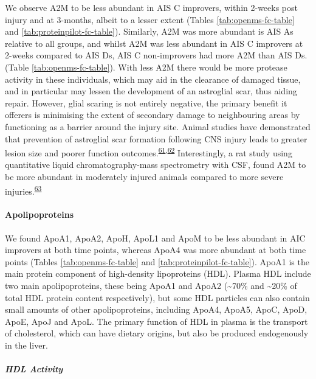 \documentclass[
]{article}
\begin{document}
We observe A2M to be less abundant in AIS C improvers, within 2-weeks post injury and at 3-months, albeit to a lesser extent (Tables \ref{tab:openms-fc-table} and \ref{tab:proteinpilot-fc-table}).
Similarly, A2M was more abundant is AIS As relative to all groups, and whilst A2M was less abundant in AIS C improvers at 2-weeks compared to AIS Ds, AIS C non-improvers had more A2M than AIS Ds. (Table \ref{tab:openms-fc-table}).
With less A2M there would be more protease activity in these individuals, which may aid in the clearance of damaged tissue, and in particular may lessen the development of an astroglial scar, thus aiding repair.
However, glial scaring is not entirely negative, the primary benefit it offerers is minimising the extent of secondary damage to neighbouring areas by functioning as a barrier around the injury site.
Animal studies have demonstrated that prevention of astroglial scar formation following CNS injury leads to greater lesion size and poorer function outcomes.\textsuperscript{\protect\hyperlink{ref-anderson_astrocyte_2016}{61},\protect\hyperlink{ref-wilhelmsson_redefining_2006}{62}}
Interestingly, a rat study using quantitative liquid chromatography-mass spectrometry with CSF, found A2M to be more abundant in moderately injured animals compared to more severe injuries.\textsuperscript{\protect\hyperlink{ref-lubieniecka_biomarkers_2011}{63}}

\hypertarget{apolipoproteins}{%
\paragraph{Apolipoproteins}\label{apolipoproteins}}

We found ApoA1, ApoA2, ApoH, ApoL1 and ApoM to be less abundant in AIC improvers at both time points, whereas ApoA4 was more abundant at both time points (Tables \ref{tab:openms-fc-table} and \ref{tab:proteinpilot-fc-table}).
ApoA1 is the main protein component of high-density lipoproteins (HDL).
Plasma HDL include two main apolipoproteins, these being ApoA1 and ApoA2 (\textasciitilde70\% and \textasciitilde20\% of total HDL protein content respectively), but some HDL particles can also contain small amounts of other apolipoproteins, including ApoA4, ApoA5, ApoC, ApoD, ApoE, ApoJ and ApoL.
The primary function of HDL in plasma is the transport of cholesterol, which can have dietary origins, but also be produced endogenously in the liver.

\hypertarget{hdl-activity}{%
\subparagraph{HDL Activity}\label{hdl-activity}}
\end{document}
